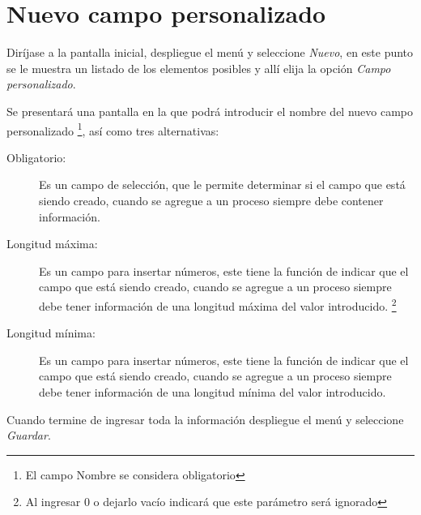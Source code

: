 \section{Nuevo campo personalizado}
\label{sec:nuevoCampo}
Dir\'ijase a la pantalla inicial, despliegue el men\'u \blackberry y seleccione
\emph{Nuevo}, en este punto se le muestra un listado de los elementos posibles y
all\'i elija la opci\'on \emph{Campo personalizado}.

Se presentar\'a una pantalla en la que podr\'a introducir el nombre del nuevo
campo personalizado
\footnote{El campo Nombre se considera obligatorio},
as\'i como tres
alternativas:
\begin{description}
\item[Obligatorio:]Es un campo de selecci\'on, que le permite determinar si el
campo que est\'a siendo creado, cuando se agregue a un proceso siempre
debe contener informaci\'on.
\item[Longitud m\'axima:]Es un campo para insertar n\'umeros, este tiene la
funci\'on de indicar que el campo que est\'a siendo creado, cuando se agregue a un proceso siempre debe tener informaci\'on de una longitud
m\'axima del valor introducido.
\footnote{Al ingresar 0 o dejarlo vac\'io indicar\'a que este par\'ametro
ser\'a ignorado}
\item[Longitud m\'inima:]Es un campo para insertar n\'umeros, este tiene la
funci\'on de indicar que el campo que est\'a siendo creado, cuando se agregue a un proceso siempre debe tener informaci\'on de una longitud
m\'inima del valor introducido.
\footnotemark[\value{footnote}]
\end{description}

Cuando termine de ingresar toda la informaci\'on despliegue el men\'u \blackberry y
seleccione \emph{Guardar}.
